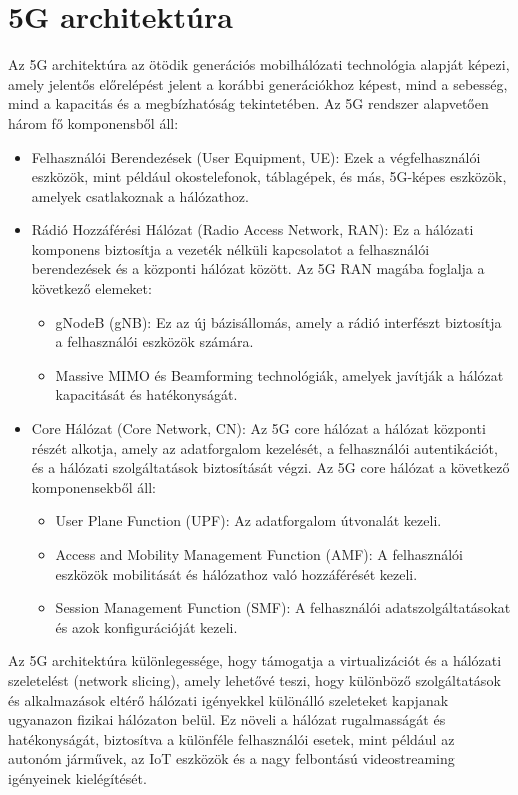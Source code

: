 \chapter{5G architektúra}

Az 5G architektúra az ötödik generációs mobilhálózati technológia alapját képezi, amely jelentős előrelépést jelent a korábbi generációkhoz képest, mind a sebesség, mind a kapacitás és a megbízhatóság tekintetében.
Az 5G rendszer alapvetően három fő komponensből áll:

\begin{itemize}
    \item Felhasználói Berendezések (User Equipment, UE): Ezek a végfelhasználói eszközök, mint például okostelefonok, táblagépek, és más, 5G-képes eszközök, amelyek csatlakoznak a hálózathoz.
    \item Rádió Hozzáférési Hálózat (Radio Access Network, RAN): Ez a hálózati komponens biztosítja a vezeték nélküli kapcsolatot a felhasználói berendezések és a központi hálózat között.
    Az 5G RAN magába foglalja a következő elemeket:
    \begin{itemize}
        \item gNodeB (gNB): Ez az új bázisállomás, amely a rádió interfészt biztosítja a felhasználói eszközök számára.
        \item Massive MIMO és Beamforming technológiák, amelyek javítják a hálózat kapacitását és hatékonyságát.
    \end{itemize}
    \item Core Hálózat (Core Network, CN): Az 5G core hálózat a hálózat központi részét alkotja, amely az adatforgalom kezelését, a felhasználói autentikációt, és a hálózati szolgáltatások biztosítását végzi.
    Az 5G core hálózat a következő komponensekből áll:
    \begin{itemize}
        \item User Plane Function (UPF): Az adatforgalom útvonalát kezeli.
        \item Access and Mobility Management Function (AMF): A felhasználói eszközök mobilitását és hálózathoz való hozzáférését kezeli.
        \item Session Management Function (SMF): A felhasználói adatszolgáltatásokat és azok konfigurációját kezeli.
    \end{itemize}
\end{itemize}

Az 5G architektúra különlegessége, hogy támogatja a virtualizációt és a hálózati szeletelést (network slicing), amely lehetővé teszi, hogy különböző szolgáltatások és alkalmazások eltérő hálózati igényekkel különálló szeleteket kapjanak ugyanazon fizikai hálózaton belül.
Ez növeli a hálózat rugalmasságát és hatékonyságát, biztosítva a különféle felhasználói esetek, mint például az autonóm járművek, az IoT eszközök és a nagy felbontású videostreaming igényeinek kielégítését.

